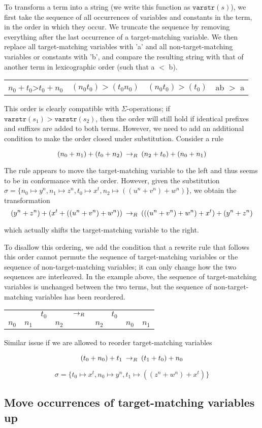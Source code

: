 To transform a term into a string (we write this function as $\texttt{varstr}(s)$), we first take the sequence of all occurrences of variables and constants in the term, in the order in which they occur. We truncate the sequence by removing everything after the last occurrence of a target-matching variable. We then replace all target-matching variables with 'a' and all non-target-matching variables or constants with 'b', and compare the resulting string with that of another term in lexicographic order (such that a $<$ b).

\begin{tabular}{llll}
$n_0 + t_0 $>$ t_0 + n_0$ & $(n_0 t_0) > (t_0 n_0)$ & $(n_0 t_0) > (t_0)$ & ab $>$ a \\
\end{tabular}

This order is clearly compatible with $\Sigma$-operations; if $\texttt{varstr}(s_1) > \texttt{varstr}(s_2)$, then the order will still hold if identical prefixes and suffixes are added to both terms. However, we need to add an additional condition to make the order closed under substitution. Consider a rule

\[ (n_0 + n_1) + (t_0 + n_2) \:\rightarrow_{R}\: (n_2 + t_0) + (n_0 + n_1)
\]

The rule appears to move the target-matching variable to the left and thus seems to be in conformance with the order. However, given the substitution $\sigma = \{ n_0 \mapsto y^n, n_1 \mapsto z^n, t_0 \mapsto x^t, n_2 \mapsto ((u^n + v^n) + w^n)\}$, we obtain the transformation
\[ (y^n + z^n) + (x^t + ((u^n + v^n) + w^n)) \:\rightarrow_{R}\: (((u^n + v^n) + w^n) + x^t) + (y^n + z^n)
\]

which actually shifts the target-matching variable to the right.

To disallow this ordering, we add the condition that a rewrite rule that follows this order cannot permute the sequence of target-matching variables or the sequence of non-target-matching variables; it can only change how the two sequences are interleaved. In the example above, the sequence of target-matching variables is unchanged between the two terms, but the sequence of non-target-matching variables has been reordered.

\begin{tabular}{ccccccccc}
      &       & $t_0$ &       & $\:\rightarrow_{R}\:$ &       & $t_0$ &       & \\
$n_0$ & $n_1$ &       & $n_2$ &             & $n_2$ &       & $n_0$ & $n_1$
\end{tabular}

Similar issue if we are allowed to reorder target-matching variables

\[ (t_0 + n_0) + t_1 \:\rightarrow_{R}\: (t_1 + t_0) + n_0
\]

\[ \sigma = \{ t_0 \mapsto x^t, n_0 \mapsto y^n, t_1 \mapsto ((z^n + w^n) + x^t)\}
\]


\subsection{Move occurrences of target-matching variables up}